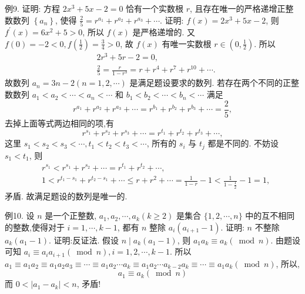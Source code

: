 例9. 证明: 方程 $2 x^3+5 x-2=0$ 恰有一个实数根 $r$, 且存在唯一的严格递增正整数数列 $\left\{a_n\right\}$, 使得 $\frac{2}{5}=r^{a_1}+r^{a_2}+r^{a_3}+\cdots$. 
证明: $f(x)=2 x^3+5 x-2$, 则 $f^{\prime}(x)=6 x^2+5>0$, 所以 $f(x)$ 是严格递增的.
又 $f(0)=-2<0, f\left(\frac{1}{2}\right)=\frac{3}{4}>0$, 故 $f(x)$ 有唯一实数根 $r \in \left(0, \frac{1}{2}\right)$. 所以
$$
\begin{aligned}
& 2 r^3+5 r-2=0, \\
& \frac{2}{5}=\frac{r}{1-r^3}=r+r^4+r^7+r^{10}+\cdots .
\end{aligned}
$$
故数列 $a_n=3 n-2(n=1,2, \cdots)$ 是满足题设要求的数列.
若存在两个不同的正整数数列 $a_1<a_2<\cdots<a_n<\cdots$ 和 $b_1< b_2<\cdots<b_n<\cdots$ 满足
$$
r^{a_1}+r^{a_2}+r^{a_3}+\cdots=r^{b_1}+r^{b_2}+r^{b_3}+\cdots=\frac{2}{5},
$$
去掉上面等式两边相同的项,有
$$
r^{s_1}+r^{s_2}+r^{s_3}+\cdots=r^{t_1}+r^{t_2}+r^{t_3}+\cdots,
$$
这里 $s_1<s_2<s_3<\cdots, t_1<t_2<t_3<\cdots$, 所有的 $s_i$ 与 $t_j$ 都是不同的.
不妨设 $s_1<t_1$, 则
$$
\begin{aligned}
& r^{s_1}<r^{s_1}+r^{s_2}+\cdots=r^{t_1}+r^{t_2}+\cdots, \\
& 1<r^{t_1-s_1}+r^{t_2-s_1}+\cdots \leqslant r+r^2+\cdots=\frac{1}{1-r}-1<\frac{1}{1-\frac{1}{2}}-1=1,
\end{aligned}
$$
矛盾.
故满足题设的数列是唯一的.



例10. 设 $n$ 是一个正整数, $a_1, a_2, \cdots, a_k(k \geqslant 2)$ 是集合 $\{1,2, \cdots, n\}$ 中的互不相同的整数,使得对于 $i=1, \cdots, k-1$, 都有 $n$ 整除 $a_i\left(a_{i+1}-1\right)$. 证明: $n$ 不整除 $a_k\left(a_1-1\right)$. 
证明:反证法.
假设 $n \mid a_k\left(a_1-1\right)$, 则 $a_1 a_k \equiv a_k(\bmod n)$.
由题设可知 $a_i \equiv a_i a_{i+1}(\bmod n), i=1,2, \cdots, k-1$. 所以
$a_1 \equiv a_1 a_2 \equiv a_1 a_2 a_3 \equiv \cdots \equiv a_1 a_2 \cdots a_k \equiv a_1 a_2 \cdots a_{k-2} a_k \equiv \cdots \equiv a_1 a_k(\bmod n)$, 所以,
$$
a_1 \equiv a_k(\bmod n)
$$
而 $0<\left|a_1-a_k\right|<n$, 矛盾!


